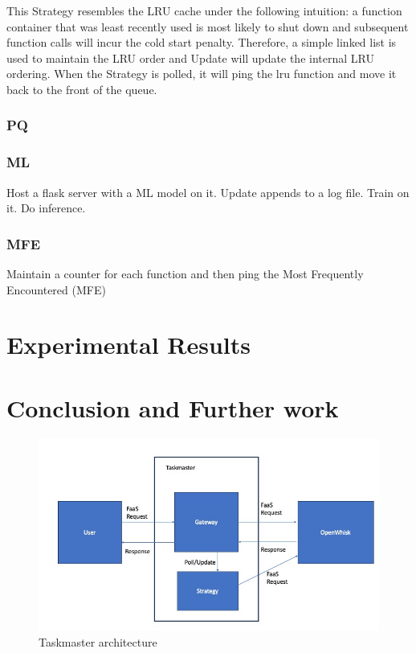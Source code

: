 \documentclass{article}
\begin{document}
This Strategy resembles the LRU cache under the following intuition: a function container that was least recently used is most likely to shut down and subsequent function calls will incur the cold start penalty. Therefore, a simple linked list is used to maintain the LRU order and Update will update the internal LRU ordering. When the Strategy is polled, it will ping the lru function and move it back to the front of the queue.

\subsubsection{PQ}

\subsubsection{ML}

Host a flask server with a ML model on it. Update appends to a log file. Train on it. Do inference.

\subsubsection{MFE}

Maintain a counter for each function and then ping the Most Frequently Encountered (MFE)

\section{Experimental Results}

\section{Conclusion and Further work}



\begin{figure}
    \begin{center}
        \includegraphics[width=\textwidth]{architecture.jpg}
    \end{center}
    \label{fig:taskmaster}
    \caption{Taskmaster architecture}
\end{figure}



\end{document}

